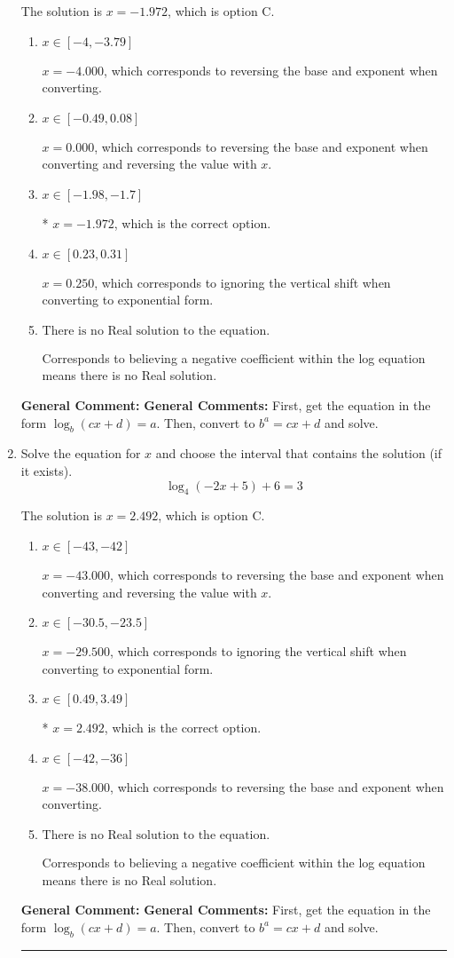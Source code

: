 \documentclass{extbook}[14pt]
\newcommand{\litem}[1]{\item #1

\rule{\textwidth}{0.4pt}}
\begin{document}
\begin{enumerate}
{The solution is \( x = -1.972 \), which is option C.\begin{enumerate}[label=\Alph*.]
\item \( x \in [-4, -3.79] \)

$x = -4.000$, which corresponds to reversing the base and exponent when converting.
\item \( x \in [-0.49, 0.08] \)

$x = 0.000$, which corresponds to reversing the base and exponent when converting and reversing the value with $x$.
\item \( x \in [-1.98, -1.7] \)

* $x = -1.972$, which is the correct option.
\item \( x \in [0.23, 0.31] \)

$x = 0.250$, which corresponds to ignoring the vertical shift when converting to exponential form.
\item \( \text{There is no Real solution to the equation.} \)

Corresponds to believing a negative coefficient within the log equation means there is no Real solution.
\end{enumerate}

\textbf{General Comment:} \textbf{General Comments:} First, get the equation in the form $\log_b{(cx+d)} = a$. Then, convert to $b^a = cx+d$ and solve.
}
\litem{
Solve the equation for $x$ and choose the interval that contains the solution (if it exists).
\[ \log_{4}{(-2x+5)}+6 = 3 \]

The solution is \( x = 2.492 \), which is option C.\begin{enumerate}[label=\Alph*.]
\item \( x \in [-43, -42] \)

$x = -43.000$, which corresponds to reversing the base and exponent when converting and reversing the value with $x$.
\item \( x \in [-30.5, -23.5] \)

$x = -29.500$, which corresponds to ignoring the vertical shift when converting to exponential form.
\item \( x \in [0.49, 3.49] \)

* $x = 2.492$, which is the correct option.
\item \( x \in [-42, -36] \)

$x = -38.000$, which corresponds to reversing the base and exponent when converting.
\item \( \text{There is no Real solution to the equation.} \)

Corresponds to believing a negative coefficient within the log equation means there is no Real solution.
\end{enumerate}

\textbf{General Comment:} \textbf{General Comments:} First, get the equation in the form $\log_b{(cx+d)} = a$. Then, convert to $b^a = cx+d$ and solve.
}
\end{enumerate}
\end{document}
